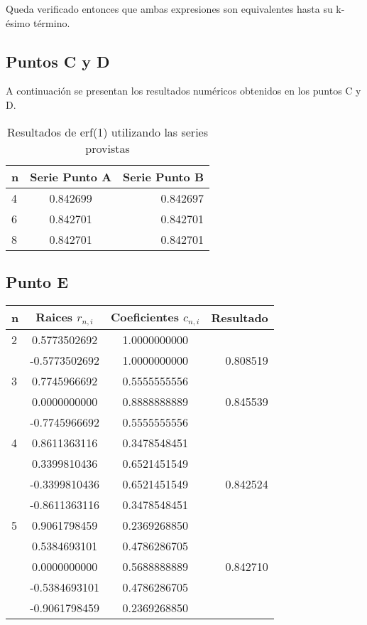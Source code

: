 \documentclass[a4paper]{article}
\begin{document}
Queda verificado entonces que ambas expresiones son equivalentes hasta su k-ésimo término.

\subsection{Puntos C y D}
A continuación se presentan los resultados numéricos obtenidos en los puntos C y D.

\begin{table}[H]
\centering
\begin{tabular}{l c  r}
\hline
n & Serie Punto A & Serie Punto B \\ \hline
4 & 0.842699 & 0.842697\\
6 & 0.842701 & 0.842701\\
8 & 0.842701 & 0.842701\\ \hline
\end{tabular}
\caption{Resultados de erf(1) utilizando las series provistas}
\end{table}

\subsection{Punto E}
\begin{table}[H]
\centering
\begin{tabular}{l c  c  r}
\hline
n & Raices $r_{n,i}$ & Coeficientes $c_{n,i}$ & Resultado \\ \hline
2 & 0.5773502692 & 1.0000000000 &   \\
  & -0.5773502692 & 1.0000000000 & 0.808519\\
  \hline
3 & 0.7745966692 & 0.5555555556 &   \\
  & 0.0000000000 & 0.8888888889 &  0.845539 \\
  & -0.7745966692 & 0.5555555556 & \\
  \hline
4 & 0.8611363116 & 0.3478548451 &   \\
  & 0.3399810436 & 0.6521451549 & \\
  & -0.3399810436 & 0.6521451549 &  0.842524\\
  & -0.8611363116 & 0.3478548451 & \\
  \hline
5 & 0.9061798459 & 0.2369268850 &   \\
  & 0.5384693101 & 0.4786286705 &   \\
  & 0.0000000000 & 0.5688888889 & 0.842710 \\
  & -0.5384693101 & 0.4786286705 &  \\
  & -0.9061798459 & 0.2369268850 &  \\ \hline
\end{tabular}
\end{table}
\end{document}
